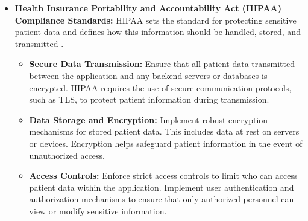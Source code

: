\begin{itemize}
    \item \textbf{Health Insurance Portability and Accountability Act (HIPAA) Compliance Standards:} HIPAA sets the standard for protecting sensitive patient data and defines how this information should be handled, stored, and transmitted \cite{HIPPA}.
    \begin{itemize}
        \item \textbf{Secure Data Transmission:} Ensure that all patient data transmitted between the application and any backend servers or databases is encrypted. HIPAA requires the use of secure communication protocols, such as TLS, to protect patient information during transmission.
        \item \textbf{Data Storage and Encryption:} Implement robust encryption mechanisms for stored patient data. This includes data at rest on servers or devices. Encryption helps safeguard patient information in the event of unauthorized access.
        \item \textbf{Access Controls:} Enforce strict access controls to limit who can access patient data within the application. Implement user authentication and authorization mechanisms to ensure that only authorized personnel can view or modify sensitive information.
    \end{itemize}
    
\end{itemize}